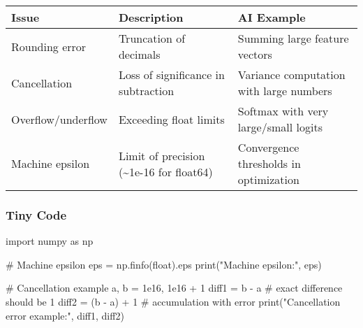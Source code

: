 \documentclass[
  letterpaper,
  DIV=11,
  numbers=noendperiod]{scrreprt}
\newenvironment{Shaded}{\begin{snugshade}}{\end{snugshade}}
\newcommand{\BuiltInTok}[1]{\textcolor[rgb]{0.00,0.23,0.31}{#1}}
\newcommand{\CommentTok}[1]{\textcolor[rgb]{0.37,0.37,0.37}{#1}}
\newcommand{\DecValTok}[1]{\textcolor[rgb]{0.68,0.00,0.00}{#1}}
\newcommand{\FloatTok}[1]{\textcolor[rgb]{0.68,0.00,0.00}{#1}}
\newcommand{\ImportTok}[1]{\textcolor[rgb]{0.00,0.46,0.62}{#1}}
\newcommand{\NormalTok}[1]{\textcolor[rgb]{0.00,0.23,0.31}{#1}}
\newcommand{\OperatorTok}[1]{\textcolor[rgb]{0.37,0.37,0.37}{#1}}
\newcommand{\StringTok}[1]{\textcolor[rgb]{0.13,0.47,0.30}{#1}}
\begin{document}
\begin{longtable}[]{@{}
  >{\raggedright\arraybackslash}p{}
  >{\raggedright\arraybackslash}p{}
  >{\raggedright\arraybackslash}p{}@{}}
\toprule\noalign{}
\begin{minipage}[b]{\linewidth}\raggedright
Issue
\end{minipage} & \begin{minipage}[b]{\linewidth}\raggedright
Description
\end{minipage} & \begin{minipage}[b]{\linewidth}\raggedright
AI Example
\end{minipage} \\
\midrule\noalign{}
\endhead
\bottomrule\noalign{}
\endlastfoot
Rounding error & Truncation of decimals & Summing large feature
vectors \\
Cancellation & Loss of significance in subtraction & Variance
computation with large numbers \\
Overflow/underflow & Exceeding float limits & Softmax with very
large/small logits \\
Machine epsilon & Limit of precision (\textasciitilde1e-16 for float64)
& Convergence thresholds in optimization \\
\end{longtable}

\subsubsection{Tiny Code}\label{tiny-code-150}

\begin{Shaded}
\begin{Highlighting}[]
\ImportTok{import}\NormalTok{ numpy }\ImportTok{as}\NormalTok{ np}

\CommentTok{\# Machine epsilon}
\NormalTok{eps }\OperatorTok{=}\NormalTok{ np.finfo(}\BuiltInTok{float}\NormalTok{).eps}
\BuiltInTok{print}\NormalTok{(}\StringTok{"Machine epsilon:"}\NormalTok{, eps)}

\CommentTok{\# Cancellation example}
\NormalTok{a, b }\OperatorTok{=} \FloatTok{1e16}\NormalTok{, }\FloatTok{1e16} \OperatorTok{+} \DecValTok{1}
\NormalTok{diff1 }\OperatorTok{=}\NormalTok{ b }\OperatorTok{{-}}\NormalTok{ a         }\CommentTok{\# exact difference should be 1}
\NormalTok{diff2 }\OperatorTok{=}\NormalTok{ (b }\OperatorTok{{-}}\NormalTok{ a) }\OperatorTok{+} \DecValTok{1}   \CommentTok{\# accumulation with error}
\BuiltInTok{print}\NormalTok{(}\StringTok{"Cancellation error example:"}\NormalTok{, diff1, diff2)}
\end{Highlighting}
\end{Shaded}
\end{document}
